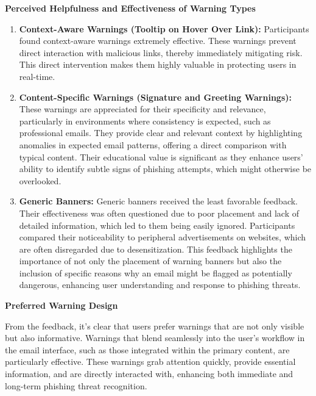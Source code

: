\documentclass[
  a4paper,  %
  twoside,  %
  bibliography=totoc,
  headsepline,
  cleardoublepage=empty,
  parskip=half,
  draft=false
]{scrbook}
\begin{document}
\textbf{Perceived Helpfulness and Effectiveness of Warning Types}
\begin{enumerate}
    \item \textbf{Context-Aware Warnings (Tooltip on Hover Over Link):}
    Participants found context-aware warnings extremely effective. These warnings prevent direct interaction with malicious links, thereby immediately mitigating risk. This direct intervention makes them highly valuable in protecting users in real-time.
    \item \textbf{Content-Specific Warnings (Signature and Greeting Warnings):}
    These warnings are appreciated for their specificity and relevance, particularly in environments where consistency is expected, such as professional emails. They provide clear and relevant context by highlighting anomalies in expected email patterns, offering a direct comparison with typical content. Their educational value is significant as they enhance users' ability to identify subtle signs of phishing attempts, which might otherwise be overlooked.
    \item \textbf{Generic Banners:}
    Generic banners received the least favorable feedback. Their effectiveness was often questioned due to poor placement and lack of detailed information, which led to them being easily ignored. Participants compared their noticeability to peripheral advertisements on websites, which are often disregarded due to desensitization. This feedback highlights the importance of not only the placement of warning banners but also the inclusion of specific reasons why an email might be flagged as potentially dangerous, enhancing user understanding and response to phishing threats.
\end{enumerate}

\textbf{Preferred Warning Design}

From the feedback, it's clear that users prefer warnings that are not only visible but also informative. Warnings that blend seamlessly into the user's workflow in the email interface, such as those integrated within the primary content, are particularly effective. These warnings grab attention quickly, provide essential information, and are directly interacted with, enhancing both immediate and long-term phishing threat recognition.


\end{document}
